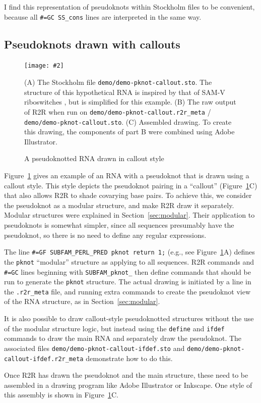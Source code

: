\documentclass[letterpaper,12pt]{report}
\newcommand{\fig}[4]{
\begin{figure}
\texttt{[image: \#2]}
\caption{#3}

\begin{small}
#4
\end{small}
\label{#1}
\end{figure}
}
\begin{document}
I find this representation of pseudoknots within Stockholm files to be convenient, because all {\tt \#=GC SS\_cons} lines are interpreted in the same way.

\subsection{Pseudoknots drawn with callouts}
\label{sec:calloutpseudoknot}
\fig{fig:calloutpseudoknot}{figures/demo-pknot-callout.pdf}{A pseudoknotted RNA drawn in  callout style}{
(A)
The Stockholm file {\tt demo/demo-pknot-callout.sto}.
The structure of this hypothetical RNA is inspired by that of SAM-V riboswitches \cite{SAMV}, but is simplified for this example.
(B)
The raw output of R2R when run on {\tt demo/demo-pknot-callout.r2r\_meta} / {\tt demo/demo-pknot-callout.sto}.
(C)
Assembled drawing.  To create this drawing, the components of part B were combined using Adobe Illustrator.
}
Figure~\ref{fig:calloutpseudoknot} gives an example of an RNA with a pseudoknot that is drawn using a callout style.  This style depicts the pseudoknot pairing in a ``callout'' (Figure~\ref{fig:calloutpseudoknot}C) that also allows R2R to shade covarying base pairs.  To achieve this, we consider the pseudoknot as a modular structure, and make R2R draw it separately.
Modular structures were explained in Section~\ref{sec:modular}.  Their application to pseudoknots is somewhat simpler, since all sequences presumably have the pseudoknot, so there is no need to define any regular expressions.

The line {\tt \#=GF SUBFAM\_PERL\_PRED pknot return 1;} (e.g., see Figure~\ref{fig:calloutpseudoknot}A) defines the {\tt pknot} ``modular'' structure as applying to all sequences.
R2R commands and {\tt \#=GC} lines beginning with {\tt SUBFAM\_pknot\_} then define commands that should be run to generate the {\tt pknot} structure.  The actual drawing is initiated by a line in the {\tt .r2r\_meta} file, and running extra commands to create the pseudoknot view of the RNA structure, as in Section~\ref{sec:modular}.

It is also possible to draw callout-style pseudoknotted structures without the use of the modular structure logic, but instead using the {\tt define} and {\tt ifdef} commands to draw the main RNA and separately draw the pseudoknot.  The associated files {\tt demo/demo-pknot-callout-ifdef.sto} and {\tt demo/demo-pknot-callout-ifdef.r2r\_meta} demonstrate how to do this.

Once R2R has drawn the pseudoknot and the main structure, these need to be assembled in a drawing program like Adobe Illustrator or Inkscape.  One style of this assembly is shown in Figure~\ref{fig:calloutpseudoknot}C.
\end{document}
